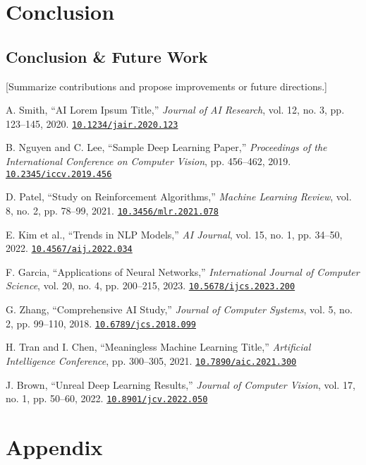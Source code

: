 \documentclass[a4paper]{book}
\newcommand{\doi}[1]{\href{https://doi.org/#1}{\texttt{#1}}} %
\begin{document}
\chapter{Conclusion}

\section{Conclusion \& Future Work}
[Summarize contributions and propose improvements or future directions.]

\begin{thebibliography}{9}
 A. Smith, ``AI Lorem Ipsum Title,'' \emph{Journal of AI Research}, vol. 12, no. 3, pp. 123--145, 2020. \doi{10.1234/jair.2020.123}

 B. Nguyen and C. Lee, ``Sample Deep Learning Paper,'' \emph{Proceedings of the International Conference on Computer Vision}, pp. 456--462, 2019. \doi{10.2345/iccv.2019.456}

 D. Patel, ``Study on Reinforcement Algorithms,'' \emph{Machine Learning Review}, vol. 8, no. 2, pp. 78--99, 2021. \doi{10.3456/mlr.2021.078}

 E. Kim et al., ``Trends in NLP Models,'' \emph{AI Journal}, vol. 15, no. 1, pp. 34--50, 2022. \doi{10.4567/aij.2022.034}

 F. Garcia, ``Applications of Neural Networks,'' \emph{International Journal of Computer Science}, vol. 20, no. 4, pp. 200--215, 2023. \doi{10.5678/ijcs.2023.200}

 G. Zhang, ``Comprehensive AI Study,'' \emph{Journal of Computer Systems}, vol. 5, no. 2, pp. 99--110, 2018. \doi{10.6789/jcs.2018.099}

 H. Tran and I. Chen, ``Meaningless Machine Learning Title,'' \emph{Artificial Intelligence Conference}, pp. 300--305, 2021. \doi{10.7890/aic.2021.300}

 J. Brown, ``Unreal Deep Learning Results,'' \emph{Journal of Computer Vision}, vol. 17, no. 1, pp. 50--60, 2022. \doi{10.8901/jcv.2022.050}
\end{thebibliography}

\appendix
\chapter{Appendix}
\end{document}
